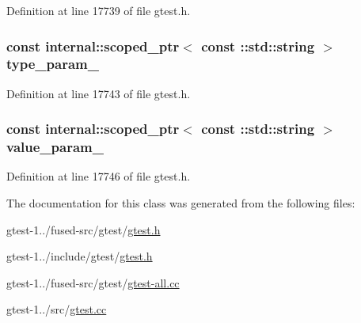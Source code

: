 \-Definition at line 17739 of file gtest.\-h.

\hypertarget{classtesting_1_1TestInfo_a85fc352afd22204cc3515cb59a7d5b38}{
\subsubsection[{type\-\_\-param\-\_\-}]{\setlength{\rightskip}{0pt plus 5cm}const {\bf internal\-::scoped\-\_\-ptr}$<$ const \-::std\-::string $>$ {\bf type\-\_\-param\-\_\-}}}\label{df/d65/classtesting_1_1TestInfo_a85fc352afd22204cc3515cb59a7d5b38}


\-Definition at line 17743 of file gtest.\-h.

\hypertarget{classtesting_1_1TestInfo_aee264753807b910c9144c99791622992}{
\subsubsection[{value\-\_\-param\-\_\-}]{\setlength{\rightskip}{0pt plus 5cm}const {\bf internal\-::scoped\-\_\-ptr}$<$ const \-::std\-::string $>$ {\bf value\-\_\-param\-\_\-}}}\label{df/d65/classtesting_1_1TestInfo_aee264753807b910c9144c99791622992}


\-Definition at line 17746 of file gtest.\-h.



\-The documentation for this class was generated from the following files\-:\begin{DoxyCompactItemize}
\item 
gtest-\/1../fused-\/src/gtest/\hyperlink{fused-src_2gtest_2gtest_8h}{gtest.\-h}\item 
gtest-\/1../include/gtest/\hyperlink{include_2gtest_2gtest_8h}{gtest.\-h}\item 
gtest-\/1../fused-\/src/gtest/\hyperlink{fused-src_2gtest_2gtest-all_8cc}{gtest-\/all.\-cc}\item 
gtest-\/1../src/\hyperlink{gtest_8cc}{gtest.\-cc}\end{DoxyCompactItemize}
